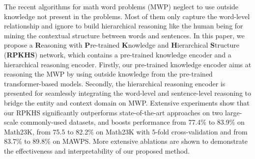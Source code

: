 The recent algorithms for math word problems (MWP) neglect to use outside knowledge not present in the problems. Most of them only capture the word-level relationship and ignore to build hierarchical reasoning like the human being for mining the contextual structure between words and sentences. In this paper, we propose a \textbf{R}easoning with \textbf{P}re-trained \textbf{K}nowledge and \textbf{H}ierarchical \textbf{S}tructure (\textbf{RPKHS}) network, which contains a pre-trained knowledge encoder and a hierarchical reasoning encoder. Firstly, our pre-trained knowledge encoder aims at reasoning the MWP by using outside knowledge from the pre-trained transformer-based models. Secondly, the hierarchical reasoning encoder is presented for seamlessly integrating the word-level and sentence-level reasoning to bridge the entity and context domain on MWP. Extensive experiments show that our RPKHS significantly outperforms state-of-the-art approaches on two large-scale commonly-used datasets, and boosts performance from 77.4\% to 83.9\% on Math23K, from 75.5 to 82.2\% on Math23K with 5-fold cross-validation and from 83.7\% to 89.8\% on MAWPS. More extensive ablations are shown to demonstrate the effectiveness and interpretability of our proposed method.
